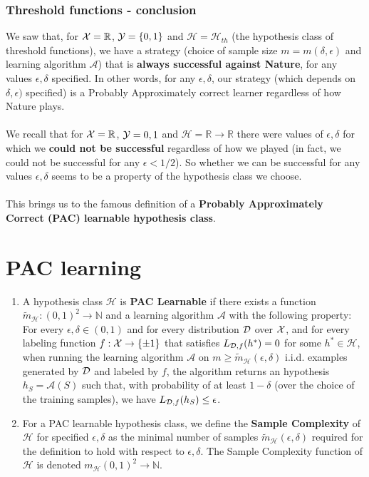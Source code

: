 \documentclass[11pt]{article}
\newcommand{\N}{\ensuremath{\mathbb{N}}}
\newcommand{\Ac}{\mathcal{A}}
\newcommand{\Hc}{\mathcal{H}}
\begin{document}
\subsubsection{Threshold functions - conclusion}

We saw that, for $\mathcal{X}=\mathbb{R}$, $\mathcal{Y}=\{0,1\}$ and $\Hc=\Hc_{th}$ (the hypothesis class of threshold functions), we have a strategy (choice of sample size $m=m(\delta,\epsilon)$ and learning algorithm $\Ac$) that is {\bf always successful against Nature}, for any values $\epsilon, \delta$ specified. In other words, for any  $\epsilon, \delta$, our strategy (which depends on $\delta,\epsilon)$ specified) is a Probably Approximately correct learner regardless of how Nature plays. 
\\~\\
We recall that for $\mathcal{X}=\mathbb{R}$, $\mathcal{Y}={0,1}$ and $\Hc=\mathbb{R}\to\mathbb{R}$ there were values of $\epsilon, \delta$ for which we {\bf could not be successful} regardless of how we played (in fact, we could not be successful for any $\epsilon<1/2$). So whether we can be successful for any values $\epsilon, \delta$ seems to be a property of the hypothesis class we choose. 
\\~\\
This brings us to the famous definition of a {\bf Probably Approximately Correct (PAC) learnable hypothesis class}.


\section{PAC learning}
\begin{definition}
\begin{enumerate}
\item
A hypothesis class $\Hc$ is {\bf PAC Learnable} if there exists a function $\tilde{m}_\Hc : (0,1)^2 \to \N$ and a learning algorithm $\Ac$ with the following property:
For every $\epsilon,\delta \in (0,1)$ and for every distribution $\mathcal{D}$ over $\mathcal{X}$, and for every labeling function 
$f:\mathcal{X}\to\{\pm 1\}$ that satisfies $L_{\mathcal{D},f}(h^*)=0$ for some $h^*\in\Hc$, when running the learning algorithm $\Ac$ on $m\ge \tilde{m}_\Hc(\epsilon,\delta)$ i.i.d. examples generated by $\mathcal{D}$ and labeled by $f$, the algorithm returns an hypothesis $h_S=\Ac(S)$ such that, with probability of at least $1-\delta$ (over the choice of the training samples), we have
$
L_{\mathcal{D}, f}(h_S) \le \epsilon
$. 
\item For a PAC learnable hypothesis class, we define the {\bf Sample Complexity} of $\Hc$ for specified $\epsilon,\delta$ as the minimal number of samples $\tilde{m}_\Hc(\epsilon,\delta)$ required for the definition to hold with respect to $\epsilon,\delta$. The Sample Complexity function of $\Hc$ is denoted $m_\Hc(0,1)^2\to\mathbb{N}$.
\end{enumerate}
\end{definition}
\end{document}
